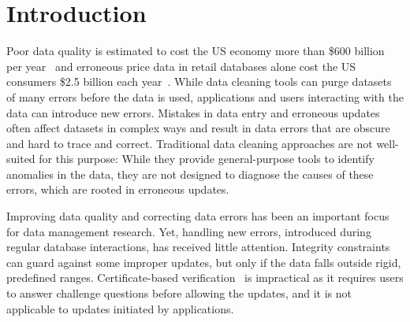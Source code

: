 
\section{Introduction}
\label{s:intro}

Poor data quality is estimated to cost the US economy more than \$600 billion
per year~\cite{eckerson2002} and erroneous price data in retail databases
alone cost the US consumers \$2.5 billion each year~\cite{Fan2008}. 
While data cleaning tools can purge datasets of many errors before the data is used,
applications and users interacting with the data can introduce new errors.
Mistakes in data entry and erroneous updates often affect datasets in complex
ways and result in data errors that are obscure and hard to trace and correct.
Traditional data cleaning approaches are not well-suited for this purpose:
While they provide general-purpose tools to identify anomalies in the data,
they are not designed to diagnose the causes of these errors, which are rooted
in erroneous updates.

Improving data quality and correcting data errors has been an important focus
for data management research. Yet, handling new errors, introduced during
regular database interactions, has received little attention. Integrity
constraints~\cite{Khoussainova2006} can guard against some improper updates,
but only if the data falls outside rigid, predefined ranges. Certificate-based
verification~\cite{Chen2011} is impractical as it requires users to answer
challenge questions before allowing the updates, and it is not applicable to
updates initiated by applications.


